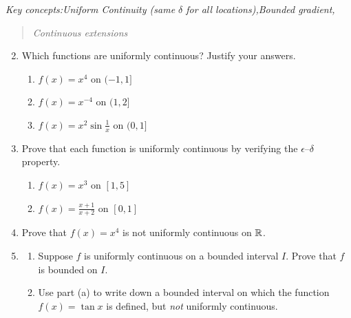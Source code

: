 \begin{exercises}
	\emph{Key concepts:\quad Uniform Continuity (same $\delta$ for all locations),\quad Bounded gradient,}\vspace{-5pt}
	\begin{quote}
		\emph{Continuous extensions}
	\end{quote}
	
	\begin{enumerate}\setcounter{enumi}{1}  
	  \item Which functions are uniformly continuous? Justify your answers.
	  \begin{enumerate}
	    \item {}
	    $f(x)=x^4$ on $(-1,1]$
	    \setcounter{enumii}{2}
	    \item \makebox[200pt][l]{$f(x)=x^{-4}$ on $(0,2]$\hfill (d) }
	    $f(x)=x^{-4}$ on $(1,2]$
	    \setcounter{enumii}{4}
	    \item $f(x)=x^2\sin\frac 1x$ on $(0,1]$
	  \end{enumerate}
	  
	  
	  \item Prove that each function is uniformly continuous by verifying the $\epsilon$--$\delta$ property.
	  \begin{enumerate}
	    \item {}
	    $f(x)=x^3$ on $[1,5]$
	    \setcounter{enumii}{2}
	    \item {}
	    $f(x)=\frac{x+1}{x+2}$ on $[0,1]$
	  \end{enumerate}
	  
	  
	  \item Prove that $f(x)=x^4$ is not uniformly continuous on $\mathbb{R}$.
	  
	  
	  \item\begin{enumerate}
	     \item Suppose $f$ is uniformly continuous on a bounded interval $I$. Prove that $f$ is bounded on $I$.
	     \item Use part (a) to write down a bounded interval on which the function $f(x)=\tan x$ is defined, but \emph{not} uniformly continuous.
	  \end{enumerate}
	

\end{enumerate}
\end{exercises}
